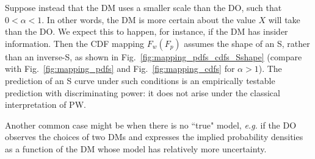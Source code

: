 \documentclass[a4paper, 12pt]{article}
\newcommand{\fref}[1]{Fig.~\ref{fig:#1}}
\newcommand{\eg}{\textit{e.g.}\xspace}
\begin{document}
Suppose instead that the DM uses a smaller scale than the DO, such that $0<\alpha<1$. In other words, the DM is more certain about the value $X$ will take than the DO. We expect this to happen, for instance, if the DM has insider information. Then the CDF mapping $F_w(F_p)$ assumes the shape of an S, rather than an inverse-S, as shown in \fref{mapping_pdfs_cdfs_Sshape} (compare with \fref{mapping_pdfs} and \fref{mapping_cdfs} for $\alpha>1$). The prediction of an S curve under such conditions is an empirically testable prediction with discriminating power: it does not arise under the classical interpretation of PW.

Another common case might be when there is no ``true" model, \eg if the DO observes the choices of two DMs and expresses the implied probability densities as a function of the DM whose model has relatively more uncertainty.
\end{document}
